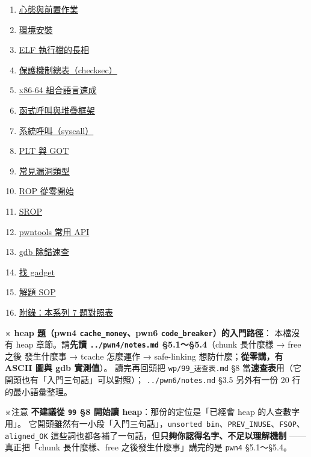 \documentclass[10pt,a4paper]{article}
\providecommand{\tightlist}{%
  \setlength{\itemsep}{0pt}\setlength{\parskip}{0pt}}
\renewenvironment{quote}{%
  \begin{mdframed}[linewidth=0pt,innerleftmargin=0pt,innerrightmargin=0pt,
    innerbottommargin=0pt,innertopmargin=0pt,skipabove=0.55em,skipbelow=0.55em,
    leftmargin=0.9em,rightmargin=0.4em,startcode={\color{quotebar}\vrule width 2.6pt},%
    endcode={}]%
  \itshape\color{black}%
}{%
  \end{mdframed}%
}
\begin{document}
\begin{enumerate}
\def\labelenumi{\arabic{enumi}.}
\tightlist
\item
  \hyperref[1-ux5fc3ux614bux8207ux524dux7f6eux4f5cux696d]{心態與前置作業}
\item
  \hyperref[2-ux74b0ux5883ux5b89ux88dd]{環境安裝}
\item
  \hyperref[3-elf-ux57f7ux884cux6a94ux7684ux9577ux76f8]{ELF
  執行檔的長相}
\item
  \hyperref[4-ux4fddux8b77ux6a5fux5236ux7e3dux8868checksec]{保護機制總表（checksec）}
\item
  \hyperref[5-x86-64-ux7d44ux5408ux8a9eux8a00ux901fux6210]{x86-64
  組合語言速成}
\item
  \hyperref[6-ux51fdux5f0fux547cux53ebux8207ux5806ux758aux6846ux67b6]{函式呼叫與堆疊框架}
\item
  \hyperref[7-ux7cfbux7d71ux547cux53ebsyscall]{系統呼叫（syscall）}
\item
  \hyperref[8-plt-ux8207-got]{PLT 與 GOT}
\item
  \hyperref[9-ux5e38ux898bux6f0fux6d1eux985eux578b]{常見漏洞類型}
\item
  \hyperref[10-rop-ux5f9eux96f6ux958bux59cb]{ROP 從零開始}
\item
  \hyperref[11-srop]{SROP}
\item
  \hyperref[12-pwntools-ux5e38ux7528-api]{pwntools 常用 API}
\item
  \hyperref[13-gdb-ux9664ux932fux901fux67e5]{gdb 除錯速查}
\item
  \hyperref[14-ux627e-gadget]{找 gadget}
\item
  \hyperref[15-ux89e3ux984c-sop]{解題 SOP}
\item
  \hyperref[ux9644ux9304ux672cux7cfbux5217-7-ux984cux5c0dux7167ux8868]{附錄：本系列
  7 題對照表}
\end{enumerate}

\begin{quote}
※ \textbf{heap 題（pwn4 \texttt{cache\_\allowbreak{}money}、pwn6
\texttt{code\_\allowbreak{}breaker}）的入門路徑}： 本檔沒有 heap 章節。請\textbf{先讀
\texttt{../\allowbreak{}pwn4/\allowbreak{}notes.\allowbreak{}md} §5.1～§5.4}（chunk 長什麼樣 → free 之後
發生什麼事 → tcache 怎麼運作 → safe-linking 想防什麼；\textbf{從零講，有
ASCII 圖與 gdb 實測值}）。 讀完再回頭把 \texttt{wp/\allowbreak{}99\_\allowbreak{}速查表.\allowbreak{}md} §8
當\textbf{速查表}用（它開頭也有「入門三句話」可以對照）；
\texttt{../\allowbreak{}pwn6/\allowbreak{}notes.\allowbreak{}md} §3.5 另外有一份 20 行的最小語彙整理。

※注意 \textbf{不建議從 \texttt{99} §8 開始讀 heap}：那份的定位是「已經會
heap 的人查數字用」。
它開頭雖然有一小段「入門三句話」，\texttt{unsorted\ \allowbreak{}bin}、\texttt{PREV\_\allowbreak{}INUSE}、\texttt{FSOP}、\texttt{aligned\_\allowbreak{}OK}
這些詞也都各補了一句話，但\textbf{只夠你認得名字、不足以理解機制} ------
真正把「chunk 長什麼樣、free 之後發生什麼事」講完的是 \texttt{pwn4}
§5.1～§5.4。
\end{quote}
\end{document}

